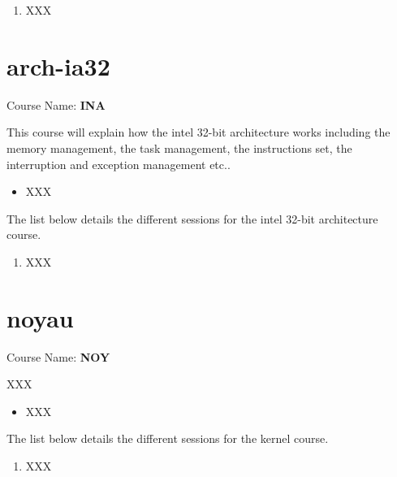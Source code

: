 \begin{multicols}{2}
\begin{enumerate}
  \item
    XXX
\end{enumerate}



\section{arch-ia32}

Course Name: \textbf{INA}

This course will explain how the intel 32-bit architecture works including
the memory management, the task management, the instructions set, the
interruption and exception management etc..

\begin{itemize}
  \item
    XXX
\end{itemize}

The list below details the different sessions for the intel 32-bit
architecture course.

\begin{enumerate}
  \item
    XXX
\end{enumerate}



\section{noyau}

Course Name: \textbf{NOY}

XXX

\begin{itemize}
  \item
    XXX
\end{itemize}

The list below details the different sessions for the kernel course.

\begin{enumerate}
  \item
    XXX
\end{enumerate}



\end{multicols}


